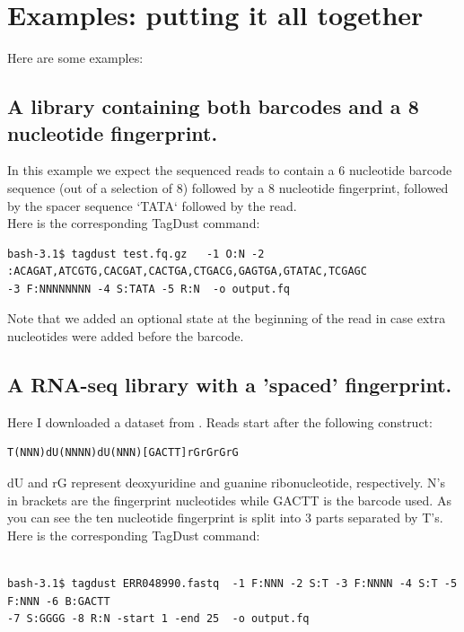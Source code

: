 \documentclass[11pt,a4paper,oneside]{book}
\begin{document}
\chapter{Examples: putting it all together}

Here are some examples: 

\section{A library containing both barcodes and a 8 nucleotide fingerprint.}

In this example we expect the sequenced reads to contain a 6 nucleotide barcode sequence (out of a selection of 8) followed by a 8 nucleotide fingerprint, followed by the spacer sequence `TATA` followed by the read. \\

Here is the corresponding TagDust command: 


{\small
\begin{verbatim}
bash-3.1$ tagdust test.fq.gz   -1 O:N -2 :ACAGAT,ATCGTG,CACGAT,CACTGA,CTGACG,GAGTGA,GTATAC,TCGAGC
-3 F:NNNNNNNN -4 S:TATA -5 R:N  -o output.fq
\end{verbatim}
}

Note that we added an optional state at the beginning of the read in case extra nucleotides were added before the barcode.  


\section{A RNA-seq library with a 'spaced' fingerprint.}

Here I downloaded a dataset from \cite{Kivioja:2012kg}. Reads start after the following construct:

{
\begin{verbatim}
T(NNN)dU(NNNN)dU(NNN)[GACTT]rGrGrGrG
\end{verbatim}
}
dU and rG represent deoxyuridine and guanine ribonucleotide, respectively. N's in brackets are the fingerprint nucleotides while GACTT is the barcode used. As you can see the ten nucleotide fingerprint is split into 3 parts separated by T's. \\

Here is the corresponding TagDust command: 


{\small
\begin{verbatim}

bash-3.1$ tagdust ERR048990.fastq  -1 F:NNN -2 S:T -3 F:NNNN -4 S:T -5 F:NNN -6 B:GACTT
-7 S:GGGG -8 R:N -start 1 -end 25  -o output.fq
\end{verbatim}
}
\end{document}

